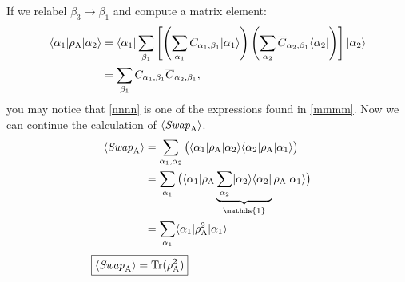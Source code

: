 If we relabel $\beta_3 \rightarrow \beta_1$ and compute a matrix element:
\begin{align}
	\langle {\alpha_1} \rvert\rho_{\rm A} \lvert {\alpha_2} \rangle
	&=   \langle {\alpha_1} \rvert\sum_{\beta_1}  \left[ \left(\sum_{\alpha_1} 
		C_{\alpha_1,\beta_1}\lvert {\alpha_1} \rangle\right)
		\left(\sum_{\alpha_2} 
		\overline{C}_{\alpha_2,\beta_1}\langle {\alpha_2} \rvert\right) \right] \lvert {\alpha_2} \rangle \\
	&= \sum_{\beta_1} C_{\alpha_1,\beta_1} \overline{C}_{\alpha_2,\beta_1} \label{nnnn},
\end{align}
you may notice that \eqref{nnnn} is one of the expressions found in \eqref{mmmm}.
Now we can continue the calculation of $\langle {\it Swap}_{\rm A} \rangle$.
\begin{align}
\langle \SWA \rangle &= \sum_{\alpha_1,\alpha_2} \big( \bra{\alpha_1}\rho_{\rm A} \ket{\alpha_2} 
					\bra{\alpha_2}\rho_{\rm A} \ket{\alpha_1}\big) \\
	&= \sum_{\alpha_1} \big( \bra{\alpha_1}\rho_{\rm A} 
				\underbrace{\sum_{\alpha_2} \ket{\alpha_2}\bra{\alpha_2}}_{\mathds{1}}
				\rho_{\rm A} \ket{\alpha_1}\big) \\
	&= \sum_{\alpha_1} \bra{\alpha_1}\rho_{\rm A}^2  \ket{\alpha_1}
\end{align}
\vspace{-5mm}
\begin{align}
	\hspace{-3.3cm}\boxed{\langle \SWA \rangle= {\rm Tr (\rho_A^2)}} \hspace{1cm}
\end{align}

